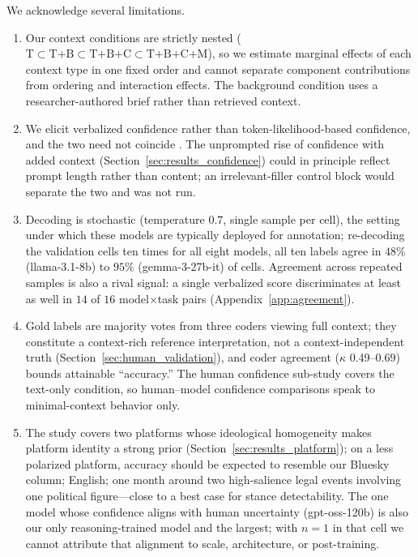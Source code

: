 \documentclass[11pt]{article}
\begin{document}
We acknowledge several limitations.
\begin{enumerate}
\setlength{\itemsep}{1pt}\setlength{\parskip}{0pt}\setlength{\parsep}{0pt}
    \item Our context conditions are strictly nested ($\text{T} \subset \text{T+B} \subset \text{T+B+C} \subset \text{T+B+C+M}$), so we estimate marginal effects of each context type in one fixed order and cannot separate component contributions from ordering and interaction effects. The background condition uses a researcher-authored brief rather than retrieved context.
    \item We elicit verbalized confidence rather than token-likelihood-based confidence, and the two need not coincide \cite{xiong_can_2024}. The unprompted rise of confidence with added context (Section~\ref{sec:results_confidence}) could in principle reflect prompt length rather than content; an irrelevant-filler control block would separate the two and was not run.
    \item Decoding is stochastic (temperature $0.7$, single sample per cell), the setting under which these models are typically deployed for annotation; re-decoding the validation cells ten times for all eight models, all ten labels agree in $48\%$ (llama-3.1-8b) to $95\%$ (gemma-3-27b-it) of cells. Agreement across repeated samples is also a rival signal: a single verbalized score discriminates at least as well in $14$ of $16$ model$\times$task pairs (Appendix~\ref{app:agreement}).
    \item Gold labels are majority votes from three coders viewing full context; they constitute a context-rich reference interpretation, not a context-independent truth (Section~\ref{sec:human_validation}), and coder agreement ($\kappa$ 0.49--0.69) bounds attainable ``accuracy.'' The human confidence sub-study covers the text-only condition, so human--model confidence comparisons speak to minimal-context behavior only.
    \item The study covers two platforms whose ideological homogeneity makes platform identity a strong prior (Section~\ref{sec:results_platform}); on a less polarized platform, accuracy should be expected to resemble our Bluesky column; English; one month around two high-salience legal events involving one political figure---close to a best case for stance detectability. The one model whose confidence aligns with human uncertainty (gpt-oss-120b) is also our only reasoning-trained model and the largest; with $n{=}1$ in that cell we cannot attribute that alignment to scale, architecture, or post-training.
\end{enumerate}
\end{document}
